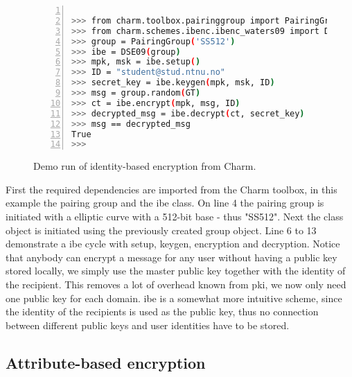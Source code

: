 \begin{figure}[H]
\begin{lstlisting}[language=bash, xleftmargin=2em, frame=single, framexleftmargin=1.5em, breaklines=true, numbers=left, numbersep=5pt, numberstyle=\tiny\color{mygray}]

>>> from charm.toolbox.pairinggroup import PairingGroup, GT
>>> from charm.schemes.ibenc.ibenc_waters09 import DSE09
>>> group = PairingGroup('SS512')
>>> ibe = DSE09(group)
>>> mpk, msk = ibe.setup()
>>> ID = "student@stud.ntnu.no"
>>> secret_key = ibe.keygen(mpk, msk, ID)
>>> msg = group.random(GT)
>>> ct = ibe.encrypt(mpk, msg, ID)
>>> decrypted_msg = ibe.decrypt(ct, secret_key)
>>> msg == decrypted_msg
True
>>> 

\end{lstlisting}
\caption{Demo run of identity-based encryption from Charm.}
\label{fig:ibenc}
\end{figure}

First the required dependencies are imported from the Charm toolbox, in this example the pairing group and the \gls{ibe} class. On line 4 the pairing group is initiated with a elliptic curve with a 512-bit base - thus "SS512". Next the class object is initiated using the previously created group object. Line 6 to 13 demonstrate a \gls{ibe} cycle with setup, keygen, encryption and decryption.
Notice that anybody can encrypt a message for any user without having a public key stored locally, we simply use the master public key together with the identity of the recipient. This removes a lot of overhead known from \gls{pki}, we now only need one public key for each domain. \Gls{ibe} is a somewhat more intuitive scheme, since the identity of the recipients is used as the public key, thus no connection between different public keys and user identities have to be stored.

\subsection{Attribute-based encryption}\label{subsec:ABE}

